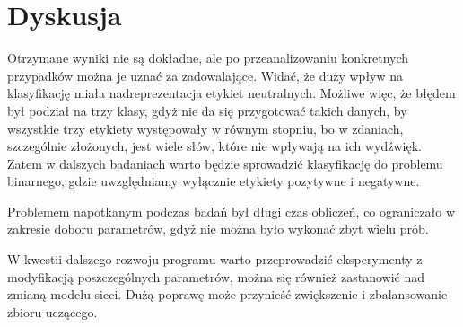 \chapter{Dyskusja}
\label{cha:dyskusja}

Otrzymane wyniki nie są dokładne, ale po przeanalizowaniu konkretnych przypadków można je uznać za zadowalające. Widać, że duży wpływ na klasyfikację miała nadreprezentacja etykiet neutralnych. Możliwe więc, że błędem był podział na trzy klasy, gdyż nie da się przygotować takich danych, by wszystkie trzy etykiety występowały w równym stopniu, bo w zdaniach, szczególnie złożonych, jest wiele słów, które nie wpływają na ich wydźwięk. Zatem w dalszych badaniach warto będzie sprowadzić klasyfikację do problemu binarnego, gdzie uwzględniamy wyłącznie etykiety pozytywne i negatywne.

Problemem napotkanym podczas badań był długi czas obliczeń, co ograniczało w zakresie doboru parametrów, gdyż nie można było wykonać zbyt wielu prób.

W kwestii dalszego rozwoju programu warto przeprowadzić eksperymenty z modyfikacją poszczególnych parametrów, można się również zastanowić nad zmianą modelu sieci. Dużą poprawę może przynieść zwiększenie i zbalansowanie zbioru uczącego.


